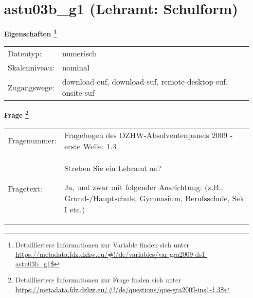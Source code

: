 
    \setcounter{footnote}{0}

    \vspace*{-1.8cm}
	\section{astu03b\_g1 (Lehramt: Schulform)}
	\label{section:astu03b_g1}



    \vspace*{0.5cm}
    \noindent\textbf{Eigenschaften
	\footnote{Detailliertere Informationen zur Variable finden sich unter
		\url{https://metadata.fdz.dzhw.eu/\#!/de/variables/var-gra2009-ds1-astu03b_g1$}}}\\
	\begin{tabularx}{\hsize}{@{}lX}
	Datentyp: & numerisch \\
	Skalenniveau: & nominal \\
	Zugangswege: &
	  download-cuf, 
	  download-suf, 
	  remote-desktop-suf, 
	  onsite-suf
 \\
    \end{tabularx}



				\vspace*{0.5cm}
                \noindent\textbf{Frage
	                \footnote{Detailliertere Informationen zur Frage finden sich unter
		              \url{https://metadata.fdz.dzhw.eu/\#!/de/questions/que-gra2009-ins1-1.3$}}}\\
				\begin{tabularx}{\hsize}{@{}lX}
					Fragenummer: &
					  Fragebogen des DZHW-Absolventenpanels 2009 - erste Welle:
					  1.3
 \\
					Fragetext: & Streben Sie ein Lehramt an?\par  Ja, und zwar mit folgender Ausrichtung: (z.B.: Grund-/Hauptschule, Gymnasium, Berufsschule, Sek I etc.) \\
				\end{tabularx}





